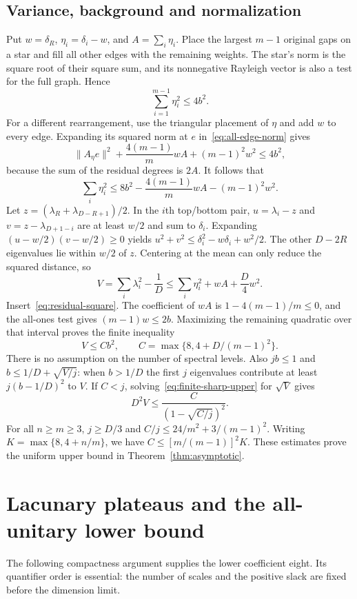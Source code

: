 \subsection{Variance, background and normalization}
Put $w=\delta_R$, $\eta_i=\delta_i-w$, and $A=\sum_i\eta_i$.
Place the largest $m-1$ original gaps on a star and fill all other
edges with the remaining weights. The star's norm is the square root
of their square sum, and its nonnegative Rayleigh vector is also a
test for the full graph. Hence
\[
 \sum_{i=1}^{m-1}\eta_i^2\leq4b^2.
\]
For a different rearrangement, use the triangular placement of
$\eta$ and add $w$ to every edge. Expanding its squared norm at $e$
in~\eqref{eq:all-edge-norm} gives
\[
 \|A_\eta e\|^2+\frac{4(m-1)}m wA+(m-1)^2w^2\leq4b^2,
\]
because the sum of the residual degrees is $2A$. It follows that
\begin{equation}\label{eq:residual-square}
 \sum_i\eta_i^2\leq8b^2-\frac{4(m-1)}m wA-(m-1)^2w^2.
\end{equation}
Let $z=(\lambda_R+\lambda_{D-R+1})/2$. In the $i$th top/bottom pair,
$u=\lambda_i-z$ and $v=z-\lambda_{D+1-i}$ are at least $w/2$ and sum
to $\delta_i$. Expanding $(u-w/2)(v-w/2)\geq0$ yields
$u^2+v^2\leq\delta_i^2-w\delta_i+w^2/2$.
The other $D-2R$ eigenvalues lie within $w/2$ of $z$.
Centering at the mean can only reduce the squared distance, so
\[
 V=\sum_i\lambda_i^2-\frac1D
 \leq\sum_i\eta_i^2+wA+\frac D4w^2.
\]
Insert~\eqref{eq:residual-square}. The coefficient of $wA$ is
$1-4(m-1)/m\leq0$, and the all-ones test gives
$(m-1)w\leq2b$. Maximizing the remaining quadratic over that interval
proves the finite inequality
\begin{equation}\label{eq:finite-sharp-upper}
 V\leq Cb^2,\qquad C=\max\{8,4+D/(m-1)^2\}.
\end{equation}
There is no assumption on the number of spectral levels.
Also $jb\leq1$ and $b\leq1/D+\sqrt{V/j}$: when $b>1/D$ the first
$j$ eigenvalues contribute at least $j(b-1/D)^2$ to $V$.
If $C<j$, solving~\eqref{eq:finite-sharp-upper} for $\sqrt V$ gives
\[
 D^2V\leq\frac{C}{(1-\sqrt{C/j})^2}.
\]
For all $n\geq m\geq3$, $j\geq D/3$ and
$C/j\leq24/m^2+3/(m-1)^2$. Writing $K=\max\{8,4+n/m\}$,
we have $C\leq[m/(m-1)]^2K$. These estimates prove the uniform
upper bound in Theorem~\ref{thm:asymptotic}.

\section{Lacunary plateaus and the all-unitary lower bound}\label{app:multiscale}
The following compactness argument supplies the lower coefficient
eight. Its quantifier order is essential: the number of scales and
the positive slack are fixed before the dimension limit.

